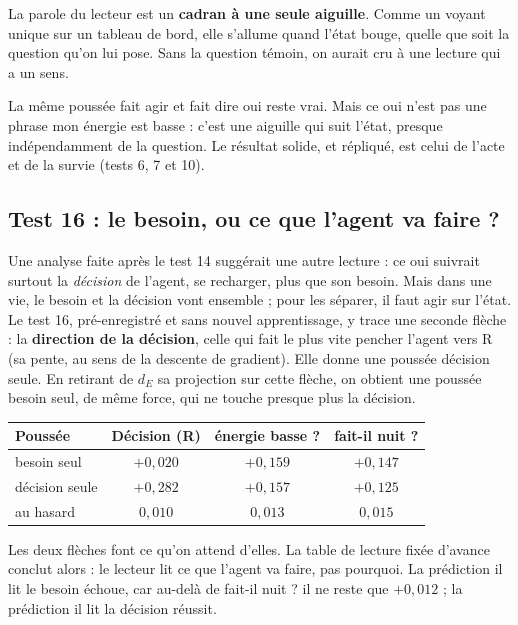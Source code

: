 \documentclass[fontsize=10pt,paper=a4,parskip=half-]{scrartcl}
\newcommand{\q}[1]{\og #1\fg{}}
\begin{document}
La parole du lecteur est un \textbf{cadran à une seule aiguille}. Comme un voyant unique
sur un tableau de bord, elle s'allume quand l'état bouge, quelle que soit la question
qu'on lui pose. Sans la question témoin, on aurait cru à une lecture qui a un sens.

\begin{essentiel}
\q{La même poussée fait agir et fait dire \q{oui}} reste vrai. Mais ce \q{oui} n'est pas
une phrase \q{mon énergie est basse} : c'est une aiguille qui suit l'état, presque
indépendamment de la question. Le résultat solide, et répliqué, est celui de l'acte et de
la survie (tests 6, 7 et 10).
\end{essentiel}

\subsection{Test 16 : le besoin, ou ce que l'agent va faire ?}
Une analyse faite après le test 14 suggérait une autre lecture : ce \q{oui} suivrait
surtout la \emph{décision} de l'agent, se recharger, plus que son besoin. Mais dans une vie,
le besoin et la décision vont ensemble ; pour les séparer, il faut agir sur l'état. Le
test 16, pré-enregistré et sans nouvel apprentissage, y trace une seconde flèche : la
\textbf{direction de la décision}, celle qui fait le plus vite pencher l'agent vers R (sa
pente, au sens de la descente de gradient). Elle donne une poussée \q{décision seule}. En
retirant de $d_E$ sa projection sur cette flèche, on obtient une poussée \q{besoin seul},
de même force, qui ne touche presque plus la décision.

\begin{center}\small
\begin{tabular}{lccc}
\toprule
\textsf{Poussée} & \textsf{Décision (R)} & \textsf{\q{énergie basse ?}} & \textsf{\q{fait-il nuit ?}}\\
\midrule
besoin seul & $+0,020$ & $+0,159$ & $+0,147$\\
décision seule & $+0,282$ & $+0,157$ & $+0,125$\\
au hasard & $0,010$ & $0,013$ & $0,015$\\
\bottomrule
\end{tabular}
\end{center}

Les deux flèches font ce qu'on attend d'elles. La table de lecture fixée d'avance conclut
alors : \q{le lecteur lit ce que l'agent va faire, pas pourquoi}. La prédiction \q{il lit
le besoin} échoue, car au-delà de \q{fait-il nuit ?} il ne reste que $+0,012$ ; la
prédiction \q{il lit la décision} réussit.
\end{document}
